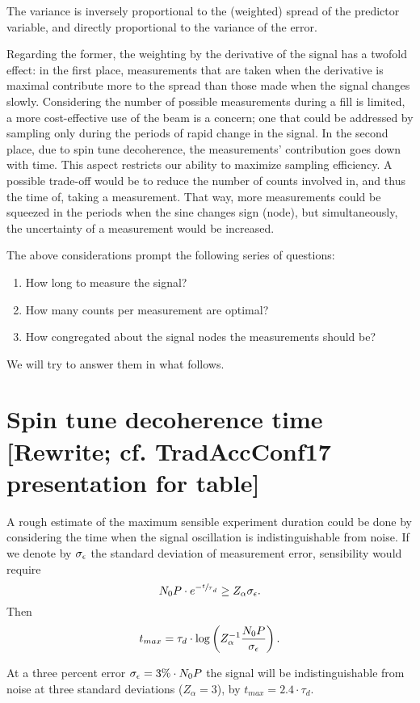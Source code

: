 \documentclass{article}
\begin{document}
The variance is inversely proportional to the (weighted) spread of the predictor variable, and directly proportional to the variance of the error. 

Regarding the former, the weighting by the derivative of the signal has a twofold effect: in the first place, measurements that are taken when the derivative is maximal contribute more to the spread than those made when the signal changes slowly. Considering the number of possible measurements during a fill is limited, a more cost-effective use of the beam is a concern; one that could be addressed by sampling only during the periods of rapid change in the signal. In the second place, due to spin tune decoherence, the measurements' contribution goes down with time. This aspect restricts our ability to maximize sampling efficiency. A possible trade-off would be to reduce the number of counts involved in, and thus the time of, taking a measurement. That way, more measurements could be squeezed in the periods when the sine changes sign (node), but simultaneously, the uncertainty of a measurement would be increased. 

The above considerations prompt the following series of questions:
\begin{enumerate}
	\item How long to measure the signal?
	\item How many counts per measurement are optimal?
	\item How congregated about the signal nodes the measurements should be?
\end{enumerate}
We will try to answer them in what follows.

\section{Spin tune decoherence time [Rewrite; cf. TradAccConf17 presentation for table]}
A rough estimate of the maximum sensible experiment duration could be done by considering the time when the signal oscillation is indistinguishable from noise. If we denote by $\SD{\meas}$ the standard deviation of measurement error, sensibility would require
\[
N_0P\cdot e^{-\sfrac t\tau_d} \geq Z_\alpha \SD{\meas}.
\]
Then 
\[
t_{max} = \tau_d\cdot \log\bkt{Z_\alpha^{-1}\frac{N_0P}{\SD{\meas}}}.
\]

At a three percent error $\SD{\meas} = 3\%\cdot N_0P$ the signal will be indistinguishable from noise at three standard deviations ($Z_\alpha = 3$), by $t_{max} = 2.4\cdot \tau_d$. 
\end{document}
